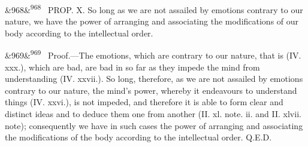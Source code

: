\documentclass[12pt]{article}
\newcommand{\para}[1][]{\par\noindent\ifx&#1&\else\textsuperscript{\footnotesize #1}~\fi}
\begin{document}
\para[968] PROP. X. So long as we are not assailed by emotions contrary to our nature, we have the power of arranging and associating the modifications of our body according to the intellectual order.

\para[969] Proof.---The emotions, which are contrary to our nature, that is (IV. xxx.), which are bad, are bad in so far as they impede the mind from understanding (IV. xxvii.). So long, therefore, as we are not assailed by emotions contrary to our nature, the mind's power, whereby it endeavours to understand things (IV. xxvi.), is not impeded, and therefore it is able to form clear and distinct ideas and to deduce them one from another (II. xl. note. ii. and II. xlvii. note); consequently we have in such cases the power of arranging and associating the modifications of the body according to the intellectual order. Q.E.D.
\end{document}
